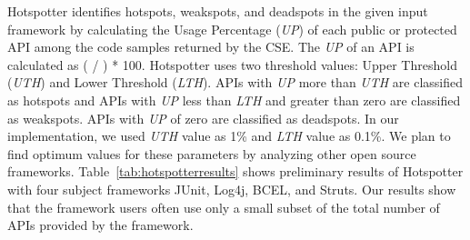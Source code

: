 Hotspotter identifies hotspots, weakspots, and deadspots in the given input framework by
calculating the Usage Percentage (\emph{UP}) of each public or protected API among
the code samples returned by the CSE. The \emph{UP} of an API is calculated as
( / ) * 100.
Hotspotter uses two threshold values: Upper Threshold (\emph{UTH}) and Lower Threshold (\emph{LTH}).
APIs with \emph{UP} more than \emph{UTH} are classified
as hotspots and APIs with \emph{UP} less than \emph{LTH} and greater than zero are classified as weakspots.
APIs with \emph{UP} of zero are classified as deadspots.
In our implementation, we used \emph{UTH} value as 1\% and \emph{LTH} value as 0.1\%.
We plan to find optimum values for these parameters by
analyzing other open source frameworks. Table~\ref{tab:hotspotterresults} shows
preliminary results of Hotspotter with four subject frameworks JUnit, Log4j,
BCEL, and Struts. Our results show that the framework users often use only a small subset of the
total number of APIs provided by the framework. 
